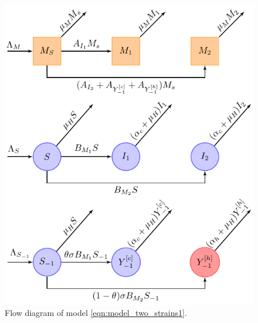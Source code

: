 \begin{figure}[h]
	\centering
	\includegraphics[width=\textwidth]{disiase_flow.pdf}
	\caption{Flow diagram of model \eqref{eqn:model_two_strains1}.}
	\label{fig:disiaseflow}
\end{figure}
%
